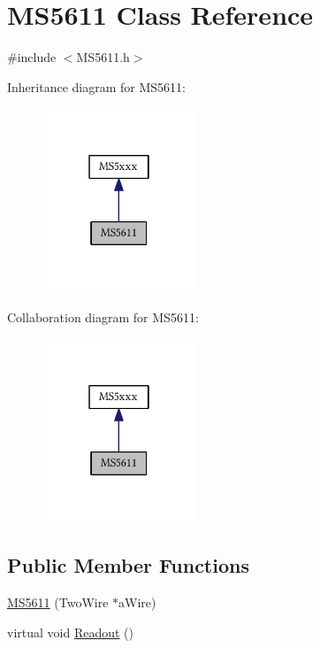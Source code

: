 \hypertarget{class_m_s5611}{}\section{M\+S5611 Class Reference}
\label{class_m_s5611}


{\ttfamily \#include $<$M\+S5611.\+h$>$}



Inheritance diagram for M\+S5611\+:\nopagebreak
\begin{figure}[H]
\begin{center}
\leavevmode
\includegraphics[width=130pt]{class_m_s5611__inherit__graph}
\end{center}
\end{figure}


Collaboration diagram for M\+S5611\+:\nopagebreak
\begin{figure}[H]
\begin{center}
\leavevmode
\includegraphics[width=130pt]{class_m_s5611__coll__graph}
\end{center}
\end{figure}
\subsection*{Public Member Functions}
\begin{DoxyCompactItemize}
\item 
\hyperlink{class_m_s5611_a48fcc0f37a1c9edcb510811f970b767b}{M\+S5611} (Two\+Wire $\ast$a\+Wire)
\item 
virtual void \hyperlink{class_m_s5611_a59c247e1180a8c4d62a6dcbe49f22b71}{Readout} ()
\end{DoxyCompactItemize}
